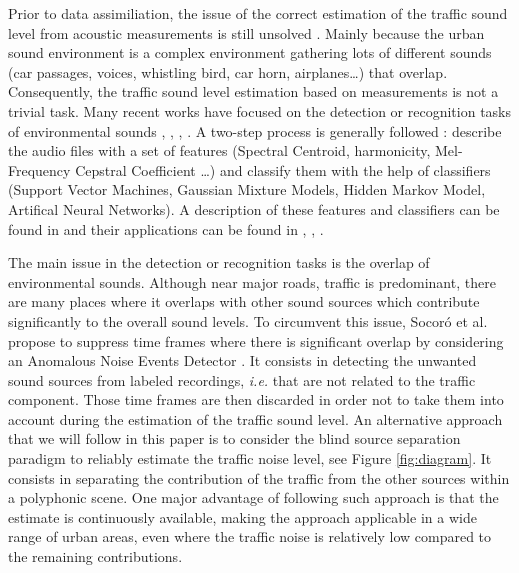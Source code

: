 \documentclass[twocolumn,a4paper,10pt]{article}
\begin{document}
Prior to data assimiliation, the issue of the correct estimation of the traffic sound level from acoustic measurements is still unsolved \cite{Mioduszewski}. Mainly because the urban sound environment is a complex environment gathering lots of different sounds (car passages, voices, whistling bird, car horn, airplanes\dots) that overlap. Consequently, the traffic sound level estimation based on measurements is not a trivial task.
Many recent works have focused on the detection or recognition tasks of environmental sounds \cite{heittola_sound_2011}, \cite{defreville_automatic_2006}, \cite{dufaux_automatic_2000}, \cite{chu_environmental_2009}. A two-step process is generally followed : describe the audio files with a set of features (Spectral Centroid, harmonicity, Mel-Frequency Cepstral Coefficient \dots) and classify them with the help of classifiers (Support Vector Machines, Gaussian Mixture Models, Hidden Markov Model, Artifical Neural Networks). A description of these features and classifiers can be found in \cite{cowling_comparison_2003} and their applications can be found in \cite{shen_environmental_2012}, \cite{beritelli_pattern_2008}, \cite{couvreur_automatic_2004}.

The main issue in the detection or recognition tasks is the overlap of environmental sounds. Although near major roads, traffic is predominant, there are many places where it overlaps with other sound sources which contribute significantly to the overall sound levels. To circumvent this issue, Socor\'o et al. propose to suppress time frames where there is significant overlap by considering an Anomalous Noise Events Detector \cite{socoro_anomalous_2017}. It consists in detecting the unwanted sound sources from labeled recordings, \textit{i.e.} that are not related to the traffic component. Those time frames are then discarded in order not to take them into account during the estimation of the traffic sound level.
An alternative approach that we will follow in this paper is to consider the blind source separation paradigm to reliably estimate the traffic noise level, see Figure \ref{fig:diagram}. It consists in separating the contribution of the traffic from the other sources within a polyphonic scene. One major advantage of following such approach is that the estimate is continuously available, making the approach applicable in a wide range of urban areas, even where the traffic noise is relatively low compared to the remaining contributions.\\
\end{document}
